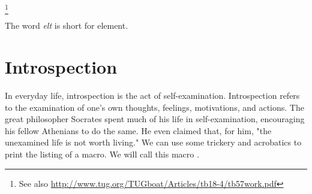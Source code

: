 \makeatletter
\def\@elt{,   }



\topline

{\footnotesize 
\cl@@ckpt 
}

\bottomline


\begin{teXX}
 \def\cl@@ckpt{\@elt{page}}
\end{teXX}

\footnote{See also \url{http://www.tug.org/TUGboat/Articles/tb18-4/tb57work.pdf}}

The word \textit{elt} is short for element.


\begin{comment}
%
%
%
%
%
%
%
%
%
%
%
%
%

\end{comment}




\section*{Introspection}
In everyday life, introspection is the act of self-examination. Introspection refers to the examination of one's own thoughts, feelings, motivations, and actions. The great philosopher Socrates spent much of his life in self-examination, encouraging his fellow Athenians to do the same. He even claimed that, for him, "the unexamined life is not worth living." We can use some \tex trickery and \latex acrobatics to print the listing of a macro. We will call this macro .


